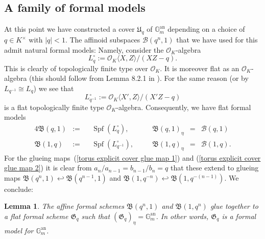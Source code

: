 \documentclass[10pt,oneside]{amsart}
\newtheorem{lemma}[theorem]{Lemma}
\theoremstyle{definition}
\theoremstyle{remark}
\begin{document}
	\subsection{A family of formal models}
	At this point we have constructed a cover $\mathfrak U_q$ of $\mathbb G_m^{\operatorname{an}}$ depending on a choice of $q\in K^\times$ with $|q|<1$. 
	The affinoid subspaces $\mathcal B(q^n,1)$ that we have used for this admit natural formal models: Namely, consider the $\mathcal O_K$-algebra
	\[L_q^\circ := \mathcal O_K\langle X,Z\rangle/(XZ-q).\]
	This is clearly of topologically finite type over $\mathcal O_K$. It is moreover flat as an $\mathcal O_K$-algebra (this should follow from Lemma 8.2.1 in \cite{Bosch lectures}). For the same reason (or by $L_{q^{-1}} \cong L_q$) we see that \[L_{q^{-1}}^\circ := \mathcal O_K\langle X',Z\rangle/(X'Z-q)\] is a flat topologically finite type $\mathcal O_K$-algebra. Consequently, we have flat formal models 
	\begin{alignat*}{4}
		\mathfrak B(q,1)&:=&& \operatorname{Spf}(L_{q}^\circ), &\quad&\mathfrak B(q,1)_\eta &=& \mathcal B(q,1)\\ 
		\mathfrak B(1,q)&:=&& \operatorname{Spf}(L_{q^{-1}}^\circ), &\quad&\mathfrak  B(1,q)_\eta &=& \mathcal B(1,q).
	\end{alignat*}
	For the glueing maps~(\ref{torus explicit cover glue map 1}) and (\ref{torus explicit cover glue map 2}) it is clear from $a_n/a_{n-1} = b_{n-1}/b_n = q$ that these extend to glueing maps $\mathfrak B(q^n,1)\hookleftarrow \mathfrak B(q^{n-1},1)$ and $\mathfrak B(1,q^{-n})\hookleftarrow \mathfrak B(1,q^{-(n-1)})$. We conclude:

	\begin{lemma}\label{formal model of torus}
		The affine formal schemes $\mathfrak B(q^n,1)$ and $\mathfrak B(1,q^n)$ glue together to a flat formal scheme $\mathfrak G_q$ such that $(\mathfrak G_q)_\eta = \mathbb G_m^{\operatorname{an}}$. In other words, $\mathfrak G_q$ is a formal model for $\mathbb G_m^{\operatorname{an}}$.
	\end{lemma}
\end{document}
